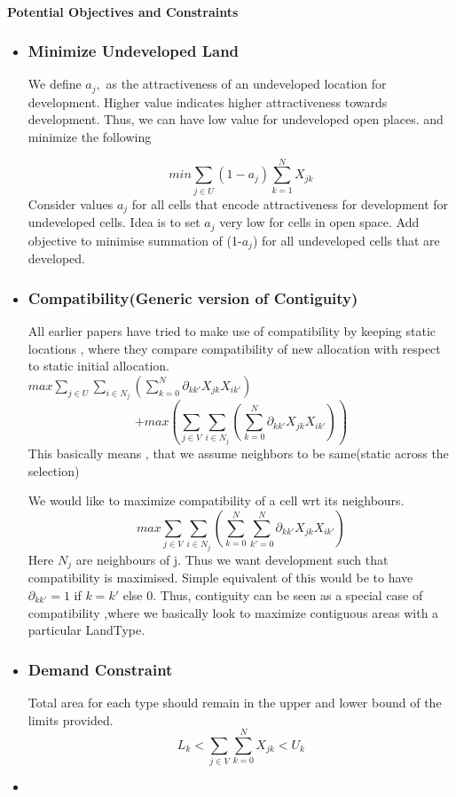\documentclass{sig-alternate}
\begin{document}
\paragraph{Potential Objectives and Constraints}
\begin{itemize}
\item
\subsubsection*{Minimize Undeveloped Land}

We define $ a_{j},$ as the attractiveness of an undeveloped location for development. Higher value indicates higher attractiveness towards development.  Thus, we can have low value for undeveloped open places. and minimize the following

 $$
 min\sum_{j \in U} (1-a_j) \sum_{k=1}^N X_{jk}
 $$
Consider values $a_j$  for all cells that encode attractiveness for development for undeveloped cells. Idea is to set $a_j$ very low for cells in open space. Add objective to minimise summation of (1-$a_j$) for all undeveloped cells that are developed. 

\item 
\subsubsection*{ Compatibility(Generic  version of Contiguity)}
All earlier papers have tried to make use of compatibility by keeping static locations , where they compare compatibility of new allocation with respect to static initial allocation.\\[.15cm]
$
max \sum_{j \in U} \sum_{i \in N_j}(\sum_{k=0}^{N}\partial_{kk'} X_{jk} X_{ik'}) 
$ 
$$+ max (\sum_{j \in V} \sum_{i \in N_j}(\sum_{k=0}^{N}\partial_{kk'} X_{jk} X_{ik'}))
$$
 This basically means , that we assume neighbors to be same(static across the selection) 

We would like to maximize compatibility of a cell wrt its neighbours.
$$
max \sum_{j \in V}  \sum_{i \in N_j}(\sum_{k=0}^{N}\sum_{k'=0}^{N}\partial_{kk'} X_{jk} X_{ik'})
 $$
Here $N_j $ are neighbours of j. Thus we want development such that compatibility is maximised. Simple equivalent of this would be to have $\partial_{kk'} = 1 $ if  $k =k'$ else $0$. Thus, contiguity can be seen as a special case of compatibility ,where we basically look to maximize contiguous areas with  a particular LandType.

\item
\subsubsection*{Demand Constraint  }
 Total area for each type should remain in the upper and lower bound of the limits provided.
$$ L_k < \sum_{j \in V} \sum_{k=0}^N X_{jk} < U_k $$
\item


\end{itemize}
\end{document}
